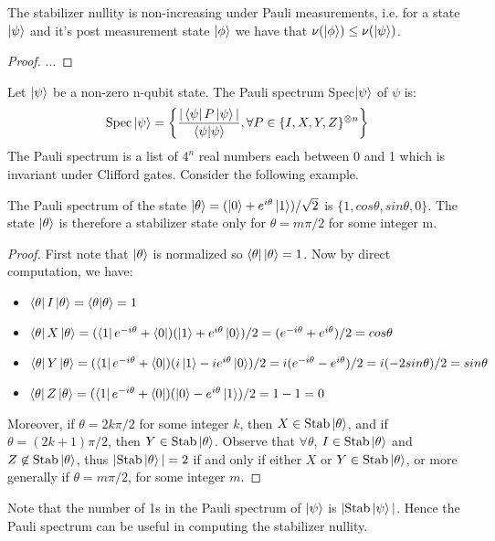 \documentclass[12pt]{dalthesis}
\begin{document}
\begin{corollary}
The stabilizer nullity is non-increasing under Pauli measurements, i.e. for a state $\ket{\psi}$ and it's post measurement state $\ket{\phi}$ we have that $\nu(\ket{\phi}) \leq \nu(\ket{\psi})$.
\end{corollary}
\begin{proof}
...
\end{proof}


\begin{definition}
Let $\ket{\psi}$ be a non-zero n-qubit state. The Pauli spectrum Spec$\ket{\psi}$ of $\psi$ is:
\begin{equation}
\text{Spec}\ket{\psi} = \left\{ \frac{|\bra{\psi}P\ket{\psi}|}{\braket{\psi|\psi}}, \forall P \in \{I, X, Y, Z\}^{\otimes n} \right\}
\end{equation}
The Pauli spectrum is a list of $4^n$ real numbers each between 0 and 1 which is invariant under Clifford gates. Consider the following example.
\end{definition}

\begin{proposition}
The Pauli spectrum of the state $\ket{\theta} = (\ket{0} + e^{i\theta}\ket{1})/\sqrt{2}$ is $\{1, cos\theta, sin\theta, 0\}$. The state $\ket{\theta}$ is therefore a stabilizer state only for $\theta = m \pi/2$ for some integer m.
\end{proposition}
\begin{proof}
First note that $\ket{\theta}$ is normalized so $\bra{\theta}\ket{\theta} = 1$. Now by direct computation, we have:
\begin{itemize}
\item $\bra{\theta}I\ket{\theta} = \braket{\theta|\theta} = 1$
\item $\bra{\theta}X\ket{\theta} = (\bra{1}e^{-i\theta} + \bra{0})(\ket{1} + e^{i\theta}\ket{0})/2 = (e^{-i\theta} + e^{i\theta})/2 = cos\theta$
\item $\bra{\theta}Y\ket{\theta} = (\bra{1}e^{-i\theta} + \bra{0})(i\ket{1} - ie^{i\theta}\ket{0})/2 = i(e^{-i\theta} - e^{i\theta})/2 = i(-2sin\theta)/2 = sin\theta$
\item $\bra{\theta}Z\ket{\theta} = (\bra{1}e^{-i\theta} + \bra{0})(\ket{0} - e^{i\theta}\ket{1})/2 = 1 - 1 = 0$
\end{itemize} 
Moreover, if $\theta = 2k\pi /2$ for some integer $k$, then $X \in \text{Stab}\ket{\theta}$, and if $\theta = (2k+1)\pi /2$, then $Y \in \text{Stab}\ket{\theta}$. Observe that $\forall \theta$, $I \in \text{Stab}\ket{\theta}$ and $Z \not\in \text{Stab}\ket{\theta}$, thus $|\text{Stab}\ket{\theta}| = 2$ if and only if either $X$ or $Y \in \text{Stab}\ket{\theta}$, or more generally if $\theta = m \pi /2$, for some integer $m$.
\end{proof}
Note that the number of 1s in the Pauli spectrum of $\ket{\psi}$ is $|\text{Stab}\ket{\psi}|$. Hence the Pauli spectrum can be useful in computing the stabilizer nullity.
\end{document}
